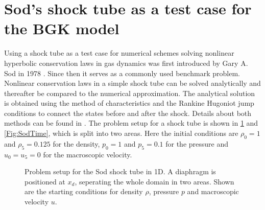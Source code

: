\section{Sod's shock tube as a test case for the BGK model} \label{Sec:FeaturesSOD}
Using a shock tube as a test case for numerical schemes solving nonlinear hyperbolic conservation laws in gas dynamics was first introduced by Gary A. Sod in 1978 \cite{Sod}. Since then it serves as a commonly used benchmark problem. Nonlinear conservation laws in a simple shock tube can be solved analytically and thereafter be compared to the numerical approximation. The analytical solution is obtained using the method of characteristics and the Rankine Hugoniot jump conditions to connect the states before and after the shock. Details about both methods can be found in \cite{CFD1}. The problem setup for a shock tube is shown in \cref{Fig:SodProbSetup} and \cref{Fig:SodTime}, which is split into two areas. Here the initial conditions are \(\rho_0 = 1\) and \(\rho_5=0.125\) for the density, \(p_0=1\) and \(p_5=0.1\) for the pressure and \(u_0=u_5=0\) for the macroscopic velocity.
\begin{figure}[H]
	\centering
	
	\caption{Problem setup for the Sod shock tube in 1D. A diaphragm is positioned at \(x_d\), seperating the whole domain in two areas. Shown are the starting conditions for density \(\rho\), pressure \(p\) and macroscopic velocity \(u\).}
	\label{Fig:SodProbSetup}
\end{figure}


